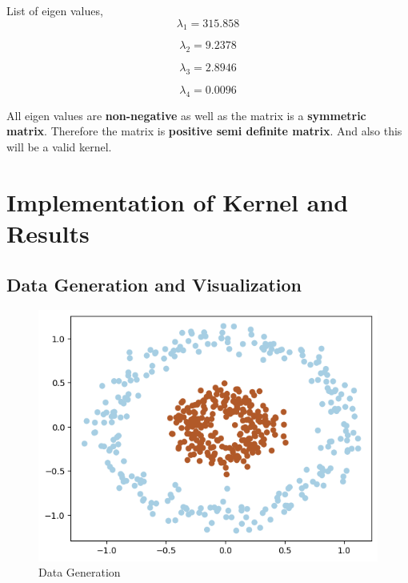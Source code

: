 \documentclass[11pt,a4paper]{article}
\begin{document}
\newpage

List of eigen values,
\begin{equation}
    \lambda_1 = 315.858
\end{equation}

\begin{equation}
    \lambda_2 = 9.2378
\end{equation}

\begin{equation}
    \lambda_3 = 2.8946
\end{equation}

\begin{equation}
    \lambda_4 = 0.0096
\end{equation}

All eigen values are \textbf{non-negative} as well as the matrix is a \textbf{symmetric matrix}. Therefore the matrix is \textbf{positive semi definite matrix}. And also this will be a valid kernel.

\section{Implementation of Kernel and Results}

\subsection{Data Generation and Visualization}

\lstset{style=mystyle}


{\begin{figure}[h]
    \centering
    \includegraphics[width=1.0\linewidth]{images/1.png}
    \caption{Data Generation}
\end{figure}}
\end{document}
